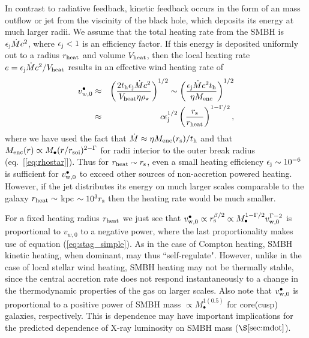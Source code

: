 \documentclass[usenatbib,fleqn]{mn2e}
\begin{document}
In contrast to radiative feedback, kinetic feedback occurs in the form of an mass outflow or jet from the viscinity of the black hole, which deposits its energy at much larger radii.  We assume that the total heating rate from the SMBH is $\epsilon_{\rm j} \dot{M}c^{2}$, where $\epsilon_{\rm j} < 1$ is an efficiency factor.  If this energy is deposited uniformly out to a radius $r_{\rm heat}$ and volume $V_{\rm heat}$, then the local heating rate $e = \epsilon_{\rm j}\dot{M}c^{2}/V_{\rm heat}$ results in an effective wind heating rate of
\begin{eqnarray}
v_{w,0}^{\bullet} &\approx&  \left(\frac{2t_{\rm h}\epsilon_{\rm j}\dot{M}c^{2}}{V_{\rm heat}\eta \rho_{\star}}\right)^{1/2} \sim \left(\frac{\epsilon_{\rm j}\dot{M}c^{2}t_{\rm h}}{\eta M_{\rm enc}}\right)^{1/2}   \nonumber \\
&\approx& c\epsilon_{\rm j}^{1/2}\left(\frac{r_{\rm s}}{r_{\rm heat}}\right)^{1-\Gamma/2},
\end{eqnarray}
where we have used the fact that $\dot{M} \approx \eta M_{\rm enc}(r_{\rm s})/t_{\rm h}$ and that $M_{\rm enc}(r) \propto M_{\bullet}(r/r_{\rm soi})^{2-\Gamma}$ for radii interior to the outer break radius (eq.~[\ref{eq:rhostar}]).  Thus for $r_{\rm heat} \sim r_{\rm s}$, even a small heating efficiency $\epsilon_{\rm j} \sim 10^{-6}$ is sufficient for $v_{\rm w,0}^{\bullet}$ to exceed other sources of non-accretion powered heating.  However, if the jet distributes its energy on much larger scales comparable to the galaxy $r_{\rm heat} \sim $ kpc $\sim 10^{3}r_{\rm s}$ then the heating rate would be much smaller. 

For a fixed heating radius $r_{\rm heat}$ we just see that $v_{\rm w,0}^{\bullet} \propto r_{\rm s}^{\beta/2} \propto M_{\bullet}^{1-\Gamma/2}v_{\rm w,0}^{\Gamma-2}$ is proportional to $v_{w,0}$ to a negative power, where the last proportionality makes use of equation (\ref{eq:stag_simple}).  As in the case of Compton heating, SMBH kinetic heating, when dominant, may thus ``self-regulate".  However, unlike in the case of local stellar wind heating, SMBH heating may not be thermally stable, since the central accretion rate does not respond instantaneously to a change in the thermodynamic properties of the gas on larger scales.  Also note that $v_{\rm w,0}^{\bullet}$ is proportional to a positive power of SMBH mass $\propto M_{\bullet}^{1(0.5)}$ for core(cusp) galaxies, respectively.  This is dependence may have important implications for the predicted dependence of X-ray luminosity on SMBH mass ($\S\ref{sec:mdot}$).    
\end{document}
